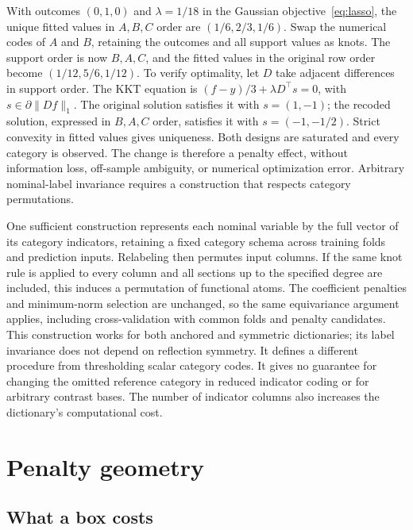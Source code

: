 \documentclass[11pt]{article}
\theoremstyle{definition}
\theoremstyle{remark}
\begin{document}
With outcomes $(0,1,0)$ and $\lambda=1/18$ in the Gaussian
objective~\eqref{eq:lasso}, the unique fitted values in $A,B,C$ order are
$(1/6,2/3,1/6)$. Swap the numerical codes of $A$ and $B$, retaining the
outcomes and all support values as knots. The support order is now $B,A,C$,
and the fitted values in the original row order become
$(1/12,5/6,1/12)$. To verify optimality, let $D$ take adjacent differences
in support order. The KKT equation is
$(f-y)/3+\lambda D^\top s=0$, with
$s\in\partial\|Df\|_1$. The original solution satisfies it with
$s=(1,-1)$; the recoded solution, expressed in $B,A,C$ order, satisfies it
with $s=(-1,-1/2)$. Strict convexity in fitted values gives uniqueness.
Both designs are saturated and every category is observed. The change is
therefore a penalty effect, without information loss, off-sample ambiguity,
or numerical optimization error. Arbitrary nominal-label invariance requires
a construction that respects category permutations.

One sufficient construction represents each nominal variable by the full
vector of its category indicators, retaining a fixed category schema across
training folds and prediction inputs. Relabeling then permutes input columns.
If the same knot rule is applied to every column and all sections up to the
specified degree are included, this induces a permutation of functional atoms.
The coefficient penalties and minimum-norm selection are unchanged, so the
same equivariance argument applies, including cross-validation with common
folds and penalty candidates. This construction works for both anchored and
symmetric dictionaries; its label invariance does not depend on reflection
symmetry. It defines a different procedure from thresholding scalar category
codes. It gives no guarantee for changing the omitted reference category in
reduced indicator coding or for arbitrary contrast bases. The number of
indicator columns also increases the dictionary's computational cost.

\section{Penalty geometry}\label{sec:cost}

\subsection{What a box costs}
\end{document}
